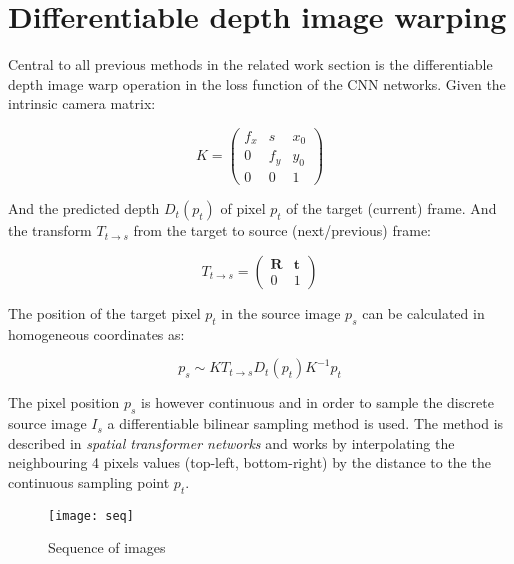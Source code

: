 \section{Differentiable depth image warping}
\label{sec:diffwarp}

Central to all previous methods in the related work section is the differentiable depth image warp operation in the loss function of the CNN networks. Given the intrinsic camera matrix:

\[
K = 
\begin{pmatrix}
f_x & s & x_0 \\
0 & f_y & y_0 \\
0 & 0   & 1
\end{pmatrix}
\]

And the predicted depth $ D_t(p_t) $ of pixel $ p_t $ of the target (current) frame. And the transform $ T_{t \rightarrow s} $ from the target to source (next/previous) frame:

\[
T_{t \rightarrow s} =
\begin{pmatrix}
\textbf{R} & \textbf{t} \\
0 & 1
\end{pmatrix}
\]

The position of the target pixel $ p_t $ in the source image $ p_s $ can be calculated in homogeneous coordinates as:

\[
p_s \sim K T_{t \rightarrow s} D_t(p_t) K^{-1} p_t 
\]

The pixel position $ p_s $ is however continuous and in order to sample the discrete source image $ I_s $ a differentiable bilinear sampling method is used. The method is described in \textit{spatial transformer networks}\cite{spatialtransformernetworks} and works by interpolating the neighbouring 4 pixels values (top-left, bottom-right) by the distance to the the continuous sampling point $ p_t $.


\begin{figure}[H]
	\centering
	\texttt{[image: seq]}
	\caption{Sequence of images}
	\label{fig:sequence}
\end{figure}